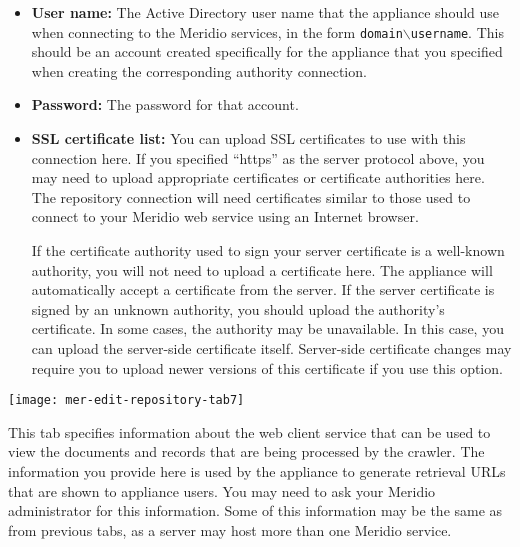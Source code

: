 \begin{itemize}


\item \textbf{User name:} The Active Directory user name that the appliance should use when connecting to the Meridio services, in the form \texttt{domain$\backslash{}$username}. This should be an account created specifically for the appliance that you specified when creating the corresponding authority connection.

\item \textbf{Password:} The password for that account.

\item \textbf{SSL certificate list:}
You can upload SSL certificates to use with this connection here. If
you specified ``https'' as the server protocol above, you may need to
upload appropriate certificates or certificate authorities here. The
repository connection will need certificates similar to those used to
connect to your Meridio web service using an Internet browser.


If the certificate authority used to sign your server certificate is a
well-known authority, you will not need to upload a certificate
here. The appliance will automatically accept a certificate from the
server. If the server certificate is signed by an unknown authority,
you should upload the authority's certificate. In some cases, the
authority may be unavailable. In this case, you can upload the
server-side certificate itself. Server-side certificate changes may
require you to upload newer versions of this certificate if you use
this option.



\end{itemize}


\texttt{[image: mer-edit-repository-tab7]}

This tab specifies information about the web client service that can
be used to view the documents and records that are being processed by
the crawler. The information you provide here is used by the appliance
to generate retrieval URLs that are shown to appliance users. You may
need to ask your Meridio administrator for this information. Some of
this information may be the same as from previous tabs, as a server
may host more than one Meridio service.

